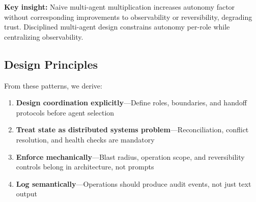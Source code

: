 \textbf{Key insight:} Naive multi-agent multiplication increases autonomy factor without corresponding improvements to observability or reversibility, degrading trust. Disciplined multi-agent design constrains autonomy per-role while centralizing observability.

\subsection{Design Principles}
\label{subsec:design-principles}

From these patterns, we derive:

\begin{enumerate}
    \item \textbf{Design coordination explicitly}---Define roles, boundaries, and handoff protocols before agent selection
    \item \textbf{Treat state as distributed systems problem}---Reconciliation, conflict resolution, and health checks are mandatory
    \item \textbf{Enforce mechanically}---Blast radius, operation scope, and reversibility controls belong in architecture, not prompts
    \item \textbf{Log semantically}---Operations should produce audit events, not just text output
\end{enumerate}
